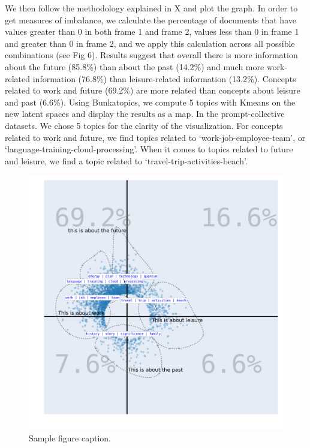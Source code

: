 \documentclass{article}
\begin{document}
We then follow the methodology explained in X and plot the graph. In order to get measures of imbalance, we calculate the percentage of documents that have values greater than 0 in both frame 1 and frame 2, values less than 0 in frame 1 and greater than 0 in frame 2, and we apply this calculation across all possible combinations (see Fig 6). Results suggest that overall there is more information about the future (85.8\%) than about the past (14.2\%) and much more work-related information (76.8\%)  than leisure-related information (13.2\%). Concepts related to work and future (69.2\%) are more related than concepts about leisure and past (6.6\%). Using Bunkatopics, we compute 5 topics with Kmeans on the new latent spaces and display the results as a map. In the prompt-collective datasets. We chose 5 topics for the clarity of the visualization. For concepts related to work and future, we find topics  related to ‘work-job-employee-team’, or ‘language-training-cloud-processing’. When it comes to topics related to future and leisure, we find a topic related to ‘travel-trip-activities-beach’.

\begin{figure}[h] %
  \centering %
  \includegraphics[width=12cm]{img/bourdieu/general_plot.png} %
  \caption{Sample figure caption.} %
\end{figure}
\end{document}
